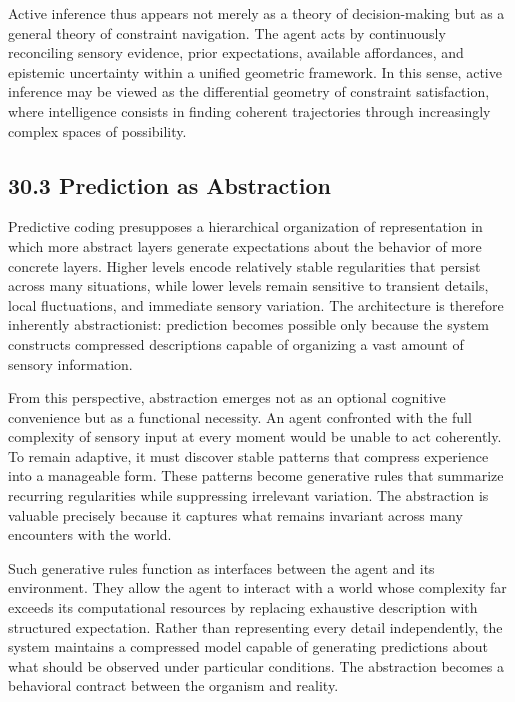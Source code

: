 \documentclass[12pt,letterpaper]{article}
\theoremstyle{remark}
\begin{document}
Active inference thus appears not merely as a theory of decision-making but as a general theory of constraint navigation. The agent acts by continuously reconciling sensory evidence, prior expectations, available affordances, and epistemic uncertainty within a unified geometric framework. In this sense, active inference may be viewed as the differential geometry of constraint satisfaction, where intelligence consists in finding coherent trajectories through increasingly complex spaces of possibility.

\subsection{30.3 Prediction as Abstraction}

Predictive coding presupposes a hierarchical organization of representation in which more abstract layers generate expectations about the behavior of more concrete layers. Higher levels encode relatively stable regularities that persist across many situations, while lower levels remain sensitive to transient details, local fluctuations, and immediate sensory variation. The architecture is therefore inherently abstractionist: prediction becomes possible only because the system constructs compressed descriptions capable of organizing a vast amount of sensory information.

From this perspective, abstraction emerges not as an optional cognitive convenience but as a functional necessity. An agent confronted with the full complexity of sensory input at every moment would be unable to act coherently. To remain adaptive, it must discover stable patterns that compress experience into a manageable form. These patterns become generative rules that summarize recurring regularities while suppressing irrelevant variation. The abstraction is valuable precisely because it captures what remains invariant across many encounters with the world.

Such generative rules function as interfaces between the agent and its environment. They allow the agent to interact with a world whose complexity far exceeds its computational resources by replacing exhaustive description with structured expectation. Rather than representing every detail independently, the system maintains a compressed model capable of generating predictions about what should be observed under particular conditions. The abstraction becomes a behavioral contract between the organism and reality.
\end{document}
